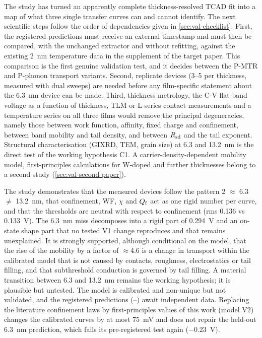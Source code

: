The study has turned an apparently complete thickness-resolved TCAD fit into a map of what three single transfer curves can and cannot identify. The next scientific steps follow the order of dependencies given in \cref{sec:val-checklist}. First, the registered predictions must receive an external timestamp and must then be compared, with the unchanged extractor and without refitting, against the existing 2~nm temperature data in the supplement of the target paper. This comparison is the first genuine validation test, and it decides between the P-MTR and P-phonon transport variants. Second, replicate devices (3--5 per thickness, measured with dual sweeps) are needed before any film-specific statement about the 6.3~nm device can be made. Third, thickness metrology, the C-V flat-band voltage as a function of thickness, TLM or L-series contact measurements and a temperature series on all three films would remove the principal degeneracies, namely those between work function, affinity, fixed charge and confinement, between band mobility and tail density, and between $R_{\mathrm{sd}}$ and the tail exponent. Structural characterisation (GIXRD, TEM, grain size) at 6.3 and 13.2~nm is the direct test of the working hypothesis C1. A carrier-density-dependent mobility model, first-principles calculations for W-doped \InO{} and further thicknesses belong to a second study (\cref{sec:val-second-paper}).

\begin{keyresult}[title={Key result: conclusions}]
The study demonstrates that the measured devices follow the pattern 2 $\approx$ 6.3 $\neq$ 13.2~nm, that confinement, WF, $\chi$ and $Q_{\mathrm{f}}$ act as one rigid number per curve, and that the thresholds are neutral with respect to confinement (rms 0.136 vs 0.133~V). The 6.3~nm miss decomposes into a rigid part of 0.294~V and an on-state shape part that no tested V1 change reproduces and that remains unexplained. It is strongly supported, although conditional on the model, that the rise of the mobility by a factor of $\approx$4.6 is a change in transport within the calibrated model that is not caused by contacts, roughness, electrostatics or tail filling, and that subthreshold conduction is governed by tail filling. A material transition between 6.3 and 13.2~nm remains the working hypothesis; it is plausible but untested. The model is calibrated and non-unique but not validated, and the registered predictions (--) await independent data. Replacing the literature confinement laws by first-principles values of this work (model V2) changes the calibrated curves by at most 75~mV and does not repair the held-out 6.3~nm prediction, which fails its pre-registered test again ($-0.23$~V).
\end{keyresult}
